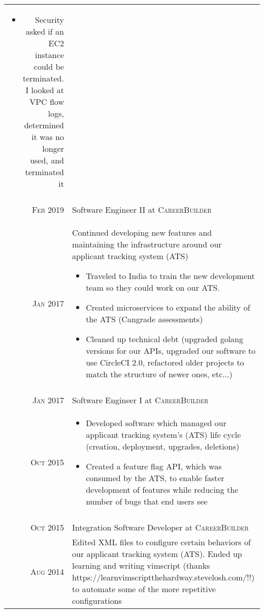 \documentclass[a4paper,10pt]{article}
\begin{document}
\begin{tabular}{r|p{13cm}}
\begin{itemize}
\begin{itemize}
   \item \footnotesize{Security asked if an EC2 instance could be terminated. I looked at VPC flow logs, determined it was no longer used, and terminated it}
   \end{itemize}
 \end{itemize}
 \\
 \multicolumn{2}{c}{} \\
 \textsc{Feb 2019} & Software Engineer II at \textsc{CareerBuilder} \\
 \textsc{Jan 2017} &
 \footnotesize{Continued developing new features and maintaining the infrastructure around our applicant tracking system (ATS)}
 \begin{itemize}
   \item \footnotesize{Traveled to India to train the new development team so they could work on our ATS.}
   \item \footnotesize{Created microservices to expand the ability of the ATS (Cangrade assessments)}
   \item \footnotesize{Cleaned up technical debt (upgraded golang versions for our APIs, upgraded our software to use CircleCI 2.0, refactored older projects to match the structure of newer ones, etc...)}
 \end{itemize}
 \\
 \multicolumn{2}{c}{} \\
 \textsc{Jan 2017} & Software Engineer I at \textsc{CareerBuilder} \\
 \textsc{Oct 2015} &
 \begin{itemize}
   \item \footnotesize{Developed software which managed our applicant tracking system's (ATS) life cycle (creation, deployment, upgrades, deletions)}
   \item \footnotesize{Created a feature flag API, which was consumed by the ATS, to enable faster development of features while reducing the number of bugs that end users see}
 \end{itemize}
 \\
 \multicolumn{2}{c}{} \\
 \textsc{Oct 2015} & Integration Software Developer at \textsc{CareerBuilder} \\
 \textsc{Aug 2014} &
 \footnotesize{Edited XML files to configure certain behaviors of our applicant tracking system (ATS). Ended up learning and writing vimscript (thanks https://learnvimscriptthehardway.stevelosh.com/!!) to automate some of the more repetitive configurations}
\end{tabular}
\end{document}
